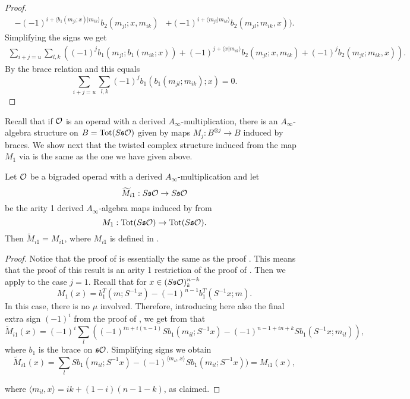 \documentclass[twoside]{article}
\begin{document}
\begin{appendices}
\begin{proof}
\begin{align}
 -(-1)^{i+\langle b_1(m_{jl};x)|m_{ik}\rangle}b_2(m_{jl};x,m_{ik})&+(-1)^{i+\langle m_{jl}| m_{ik}\rangle}b_2(m_{jl};m_{ik},x)).\nonumber
\end{align}
Simplifying the signs we get
\begin{align*}
\sum_{i+j=u}\sum_{l,k}((-1)^jb_1(m_{jl}; b_1(m_{ik};x))
 +(-1)^{j+\langle x|m_{ik}\rangle}b_2(m_{jl};x,m_{ik})+(-1)^{j}b_2(m_{jl};m_{ik},x)).
\end{align*}
By the brace relation and  this equals
\[\sum_{i+j=u}\sum_{l,k}(-1)^jb_1(b_1(m_{jl};m_{ik});x)=0.\]
\end{proof}


Recall that if ${\mathcal O}$ is an operad with a derived $A_\infty$-multiplication, there is an $A_\infty$-algebra structure on $B=\mathrm{Tot}(S\mathfrak{s}{\mathcal O})$ given by maps $M_j:B^{\otimes j}\to B$ induced by braces. We show next that the twisted complex structure induced from the map $M_1$ via  is the same as the one we have given above.

\begin{corollary}
Let ${\mathcal O}$ be a bigraded operad with a derived $A_\infty$-multiplication and let \[\widetilde{M}_{i1}:S\mathfrak{s}{\mathcal O}\to S\mathfrak{s}{\mathcal O}\] be the arity 1 derived $A_\infty$-algebra maps induced by  from \[M_1:\mathrm{Tot}(S\mathfrak{s}{\mathcal O})\to \mathrm{Tot}(S\mathfrak{s}{\mathcal O}).\]
Then $\widetilde{M}_{i1}=M_{i1}$, where $M_{i1}$ is defined in .
\end{corollary}
\begin{proof}
Notice that the proof of  is essentially the same as the proof . This means that the proof of this result is an arity 1 restriction of the proof of . Then we apply  to the case $j=1$. Recall that for $x\in (S\mathfrak{s}{\mathcal O})^{n-k}_{k}$
\[M_1(x)=b_1^T(m;S^{-1}x)-(-1)^{n-1}b_1^T(S^{-1}x;m).\]
 In this case, there is no $\mu$ involved. Therefore, introducing here also the final extra sign $(-1)^i$ from the proof of , we get from  that
\[\widetilde{M}_{i1}(x)=(-1)^i\sum_l((-1)^{in+i(n-1)} Sb_1(m_{il};S^{-1}x)-(-1)^{n-1+in+k}Sb_1(S^{-1}x;m_{il})),\] where $b_1$ is the brace on $\mathfrak{s}{\mathcal O}$. Simplifying signs we obtain
\[\widetilde{M}_{i1}(x)=\sum_l Sb_1(m_{il};S^{-1}x)-(-1)^{\langle  m_{il},x\rangle}Sb_1(m_{il};S^{-1}x))=M_{i1}(x),\]

where $\langle  m_{il},x\rangle=ik+(1-i)(n-1-k)$, as claimed.
\end{proof}








\end{appendices}


\end{document}
